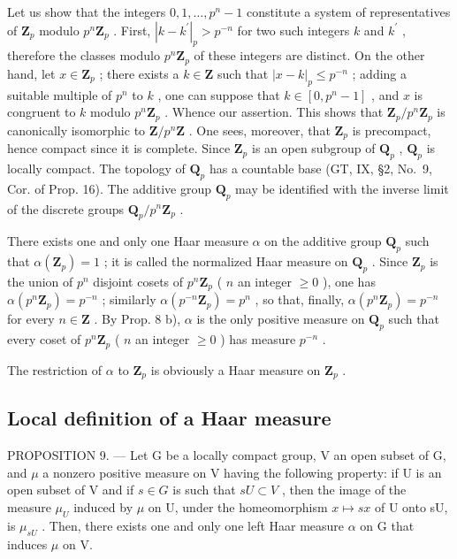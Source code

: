 Let us show that the integers \(0,1,\ldots,p^{n}-1\) constitute a system of representatives of \(\mathbf{Z}_{p}\) modulo \(p^{n}\mathbf{Z}_{p}\) . First, \(|k-k^{\prime}|_{p}>p^{-n}\) for two such integers \(k\) and \(k^{\prime}\) , therefore the classes modulo \(p^{n}\mathbf{Z}_{p}\) of these integers are distinct. On the other hand, let \(x\in\mathbf{Z}_{p}\) ; there exists a \(k\in\mathbf{Z}\) such that \(|x-k|_{p}\leqslant p^{-n}\) ; adding a suitable multiple of \(p^{n}\) to \(k\) , one can suppose that \(k\in[0,p^{n}-1]\) , and \(x\) is congruent to \(k\) modulo \(p^{n}\mathbf{Z}_{p}\) . Whence our assertion. This shows that \(\mathbf{Z}_{p}/p^{n}\mathbf{Z}_{p}\) is canonically isomorphic to \(\mathbf{Z}/p^{n}\mathbf{Z}\) . One sees, moreover, that \(\mathbf{Z}_{p}\) is precompact, hence compact since it is complete. Since \(\mathbf{Z}_{p}\) is an open subgroup of \(\mathbf{Q}_{p}\) , \(\mathbf{Q}_{p}\) is locally compact. The topology of \(\mathbf{Q}_{p}\) has a countable base (GT, IX, §2, No.~9, Cor. of Prop. 16). The additive group \(\mathbf{Q}_{p}\) may be identified with the inverse limit of the discrete groups \(\mathbf{Q}_{p}/p^{n}\mathbf{Z}_{p}\) .

There exists one and only one Haar measure \(\alpha\) on the additive group \(\mathbf{Q}_p\) such that \(\alpha(\mathbf{Z}_p) = 1\) ; it is called the normalized Haar measure on \(\mathbf{Q}_p\) . Since \(\mathbf{Z}_p\) is the union of \(p^n\) disjoint cosets of \(p^n\mathbf{Z}_p\) ( \(n\) an integer \(\geqslant 0\) ), one has \(\alpha(p^n\mathbf{Z}_p) = p^{-n}\) ; similarly \(\alpha(p^{-n}\mathbf{Z}_p) = p^n\) , so that, finally, \(\alpha(p^n\mathbf{Z}_p) = p^{-n}\) for every \(n \in \mathbf{Z}\) . By Prop. 8 b), \(\alpha\) is the only positive measure on \(\mathbf{Q}_p\) such that every coset of \(p^n\mathbf{Z}_p\) ( \(n\) an integer \(\geqslant 0\) ) has measure \(p^{-n}\) .

The restriction of \(\alpha\) to \(\mathbf{Z}_p\) is obviously a Haar measure on \(\mathbf{Z}_p\) .

\subsection{Local definition of a Haar measure}

PROPOSITION 9. --- Let G be a locally compact group, V an open subset of G, and \(\mu\) a nonzero positive measure on V having the following property: if U is an open subset of V and if \(s \in G\) is such that \(sU \subset V\) , then the image of the measure \(\mu_{U}\) induced by \(\mu\) on U, under the homeomorphism \(x \mapsto sx\) of U onto sU, is \(\mu_{sU}\) . Then, there exists one and only one left Haar measure \(\alpha\) on G that induces \(\mu\) on V.

